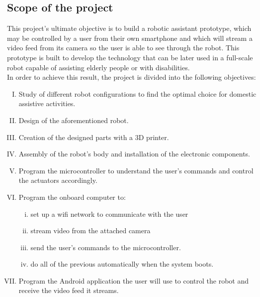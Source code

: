 \subsection{Scope of the project}

This project's ultimate objective is to build a robotic assistant prototype, which may be controlled by a user from their own smartphone and which will stream a video feed from its camera so the user is able to see through the robot. This prototype is built to develop the technology that can be later used in a full-scale robot capable of assisting elderly people or with disabilities.\\

In order to achieve this result, the project is divided into the following objectives:

	\begin{enumerate}[I.]

		\item Study of different robot configurations to find the optimal choice for domestic assistive activities.\\

		\item Design of the aforementioned robot.\\

		\item Creation of the designed parts with a 3D printer.\\

		\item Assembly of the robot's body and installation of the electronic components.\\

		\item Program the microcontroller to understand the user's commands and control the actuators accordingly.\\

		\item Program the onboard computer to: 
			\begin{enumerate}[i.] 
			\item set up a wifi network to communicate with the user
			\item stream video from the attached camera 
			\item send the user's commands to the microcontroller.
			\item do all of the previous automatically when the system boots.\\
			\end{enumerate}

	
		\item Program the Android application the user will use to control the robot and receive the video feed it streams.

	\end{enumerate}



